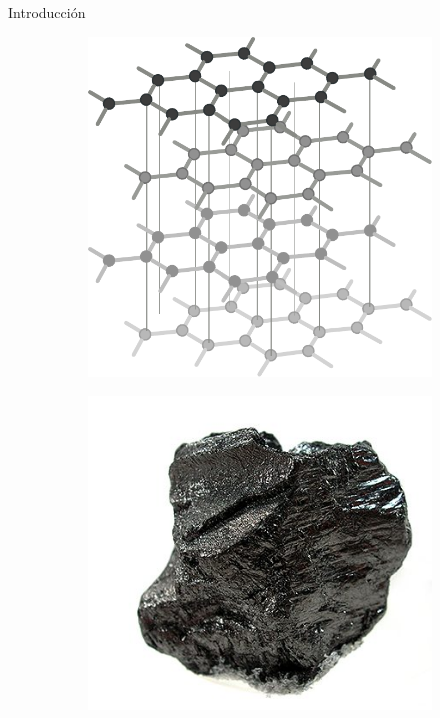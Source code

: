 \documentclass[aspectratio=169]{beamer}
\begin{document}
	\begin{frame}{Introducción}
		\begin{figure}
			\centering
			\begin{subfigure}[b]{0.15\textwidth}
				\includegraphics[width=\textwidth]{graphite_structure.pdf}
				\caption{}
				\label{fig:graphite_struct}
			\end{subfigure}
			\begin{subfigure}[b]{0.15\textwidth}
				\includegraphics[width=\textwidth]{graphite_image.jpg}

\end{subfigure}
\end{figure}
\end{frame}
\end{document}

